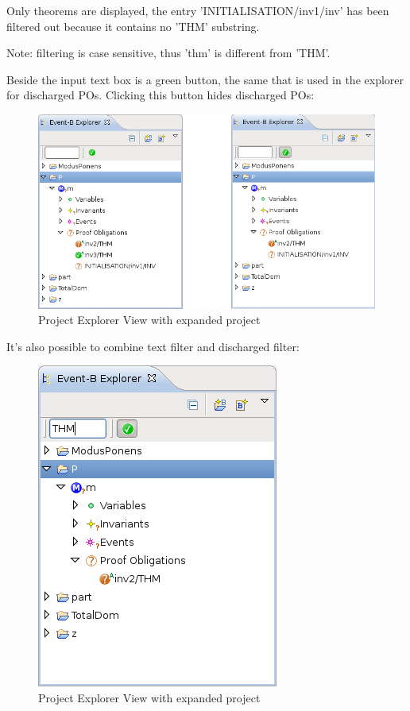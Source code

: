 Only theorems are displayed, the entry 'INITIALISATION/inv1/inv' has been filtered out because it contains no 'THM' substring.

Note: filtering is case sensitive, thus 'thm' is different from 'THM'.

Beside the input text box is a green button, the same that is used in the explorer for discharged POs. Clicking this button hides discharged POs: 

\begin{figure}[!h]
\begin{center}
	\includegraphics{img/reference/ref_01_project_explorer8.png}
	\caption{Project Explorer View with expanded project}
	\label{fig_ref_01_project_explorer8}
\end{center}
\end{figure}

It's also possible to combine text filter and discharged filter: 

\begin{figure}[!h]
\begin{center}
	\includegraphics{img/reference/ref_01_project_explorer9.png}
	\caption{Project Explorer View with expanded project}
	\label{fig_ref_01_project_explorer9}
\end{center}
\end{figure}

